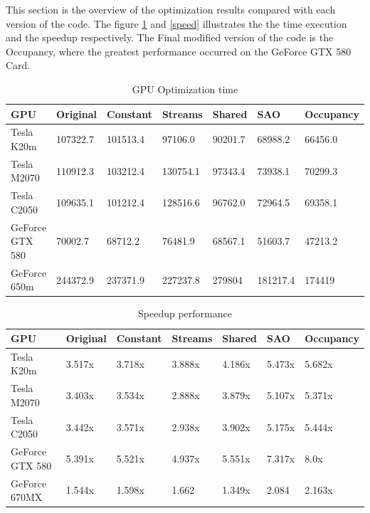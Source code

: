 This section is the overview of the optimization results compared with each version of the code. The figure \ref{tab:time} and \ref{speed} illustrates the the time execution and the speedup respectively. The Final modified version of the code is the Occupancy, where the greatest performance occurred on the GeForce GTX 580 Card.

\begin{table}[h]
\centering
  \begin{tabular} { |  l  |  l | l  |  l  | l | l | l |}
    \hline
    GPU & Original & Constant & Streams & Shared & SAO & Occupancy \\
    \hline
    Tesla K20m & 107322.7 & 101513.4 & 97106.0 & 90201.7 & 68988.2 & 66456.0\\
   \hline
    Tesla M2070 & 110912.3 & 103212.4 & 130754.1 & 97343.4 & 73938.1 & 70299.3\\
    \hline
    Tesla C2050 & 109635.1 & 101212.4 & 128516.6 & 96762.0 & 72964.5 & 69358.1\\
   \hline
    GeForce GTX 580 & 70002.7 & 68712.2 & 76481.9 & 68567.1 & 51603.7 & 47213.2\\
   \hline
    GeForce 650m & 244372.9 & 237371.9 & 227237.8 & 279804 & 181217.4 & 174419\\
   \hline
  \end{tabular}
    \caption{GPU Optimization time}
  \label{tab:time}
  \end{table}
  
  \begin{table}[h]
\centering
  \begin{tabular} { |  l  |  l | l  |  l  | l | l | l |}
    \hline
    GPU & Original & Constant & Streams & Shared & SAO & Occupancy\\
    \hline
    Tesla K20m & 3.517x & 3.718x & 3.888x & 4.186x & 5.473x & 5.682x\\
   \hline
    Tesla M2070 & 3.403x & 3.534x & 2.888x & 3.879x & 5.107x & 5.371x\\
    \hline
    Tesla C2050 & 3.442x & 3.571x & 2.938x & 3.902x & 5.175x & 5.444x\\
   \hline
    GeForce GTX 580 & 5.391x & 5.521x & 4.937x & 5.551x & 7.317x & 8.0x\\
   \hline
    GeForce 670MX & 1.544x & 1.598x & 1.662 & 1.349x & 2.084 & 2.163x\\
   \hline
  \end{tabular}
    \caption{Speedup performance}
  \label{tab:speed}
  \end{table}

